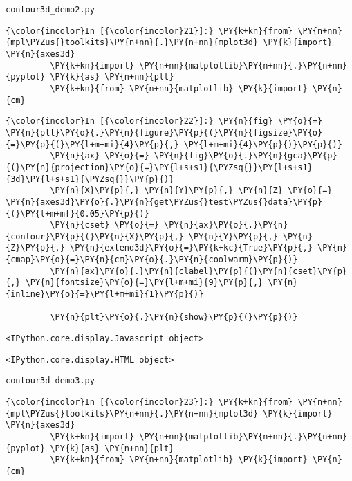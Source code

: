     
    \texttt{contour3d\_demo2.py}

    \begin{Verbatim}[commandchars=\\\{\},frame=single,framerule=0.3mm,rulecolor=\color{cellframecolor}]
{\color{incolor}In [{\color{incolor}21}]:} \PY{k+kn}{from} \PY{n+nn}{mpl\PYZus{}toolkits}\PY{n+nn}{.}\PY{n+nn}{mplot3d} \PY{k}{import} \PY{n}{axes3d}
         \PY{k+kn}{import} \PY{n+nn}{matplotlib}\PY{n+nn}{.}\PY{n+nn}{pyplot} \PY{k}{as} \PY{n+nn}{plt}
         \PY{k+kn}{from} \PY{n+nn}{matplotlib} \PY{k}{import} \PY{n}{cm}
\end{Verbatim}


    \begin{Verbatim}[commandchars=\\\{\},frame=single,framerule=0.3mm,rulecolor=\color{cellframecolor}]
{\color{incolor}In [{\color{incolor}22}]:} \PY{n}{fig} \PY{o}{=} \PY{n}{plt}\PY{o}{.}\PY{n}{figure}\PY{p}{(}\PY{n}{figsize}\PY{o}{=}\PY{p}{(}\PY{l+m+mi}{4}\PY{p}{,} \PY{l+m+mi}{4}\PY{p}{)}\PY{p}{)}
         \PY{n}{ax} \PY{o}{=} \PY{n}{fig}\PY{o}{.}\PY{n}{gca}\PY{p}{(}\PY{n}{projection}\PY{o}{=}\PY{l+s+s1}{\PYZsq{}}\PY{l+s+s1}{3d}\PY{l+s+s1}{\PYZsq{}}\PY{p}{)}
         \PY{n}{X}\PY{p}{,} \PY{n}{Y}\PY{p}{,} \PY{n}{Z} \PY{o}{=} \PY{n}{axes3d}\PY{o}{.}\PY{n}{get\PYZus{}test\PYZus{}data}\PY{p}{(}\PY{l+m+mf}{0.05}\PY{p}{)}
         \PY{n}{cset} \PY{o}{=} \PY{n}{ax}\PY{o}{.}\PY{n}{contour}\PY{p}{(}\PY{n}{X}\PY{p}{,} \PY{n}{Y}\PY{p}{,} \PY{n}{Z}\PY{p}{,} \PY{n}{extend3d}\PY{o}{=}\PY{k+kc}{True}\PY{p}{,} \PY{n}{cmap}\PY{o}{=}\PY{n}{cm}\PY{o}{.}\PY{n}{coolwarm}\PY{p}{)}
         \PY{n}{ax}\PY{o}{.}\PY{n}{clabel}\PY{p}{(}\PY{n}{cset}\PY{p}{,} \PY{n}{fontsize}\PY{o}{=}\PY{l+m+mi}{9}\PY{p}{,} \PY{n}{inline}\PY{o}{=}\PY{l+m+mi}{1}\PY{p}{)}
         
         \PY{n}{plt}\PY{o}{.}\PY{n}{show}\PY{p}{(}\PY{p}{)}
\end{Verbatim}


    
    \begin{verbatim}
<IPython.core.display.Javascript object>
    \end{verbatim}

    
    
    \begin{verbatim}
<IPython.core.display.HTML object>
    \end{verbatim}

    
    \texttt{contour3d\_demo3.py}

    \begin{Verbatim}[commandchars=\\\{\},frame=single,framerule=0.3mm,rulecolor=\color{cellframecolor}]
{\color{incolor}In [{\color{incolor}23}]:} \PY{k+kn}{from} \PY{n+nn}{mpl\PYZus{}toolkits}\PY{n+nn}{.}\PY{n+nn}{mplot3d} \PY{k}{import} \PY{n}{axes3d}
         \PY{k+kn}{import} \PY{n+nn}{matplotlib}\PY{n+nn}{.}\PY{n+nn}{pyplot} \PY{k}{as} \PY{n+nn}{plt}
         \PY{k+kn}{from} \PY{n+nn}{matplotlib} \PY{k}{import} \PY{n}{cm}
\end{Verbatim}


